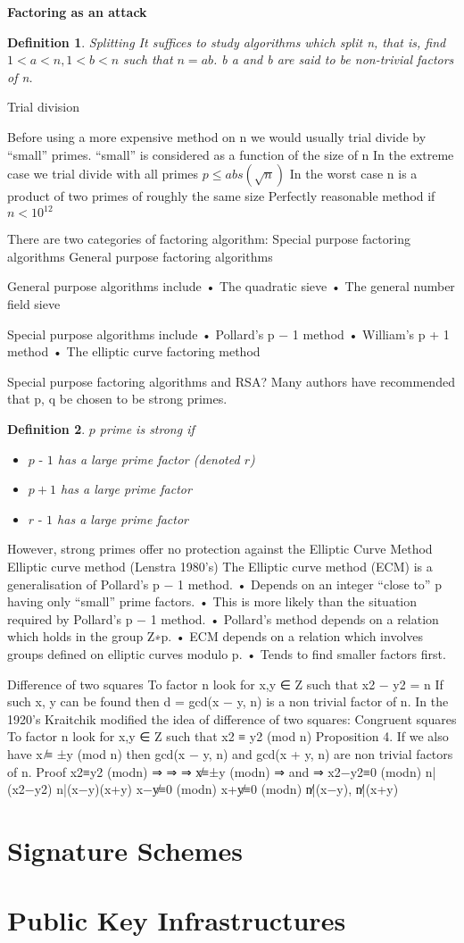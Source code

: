 \documentclass{article}
\theoremstyle{quest}
\newtheorem*{definition}{Definition}
\newcommand{\mns}{\textrm{ -  }}
\begin{document}
\textbf{Factoring as an attack}
\begin{definition}
    \textit{Splitting}
It suffices to study algorithms which split n, that is, 
    find $1 < a < n, 1 < b < n$ such that $n = ab$.
    b a and b are said to be non-trivial factors of n.
\end{definition}

Trial division

Before using a more expensive method on n we would usually trial divide by “small” primes.
 “small” is considered as a function of the size of n
In the extreme case we trial divide with all primes $p \leq abs(\sqrt{n})$
In the worst case n is a product of two primes of roughly the same size
Perfectly reasonable method if $n < 10^{12}$

There are two categories of factoring algorithm:
Special purpose factoring algorithms
General purpose factoring algorithms

General purpose algorithms include
• The quadratic sieve
• The general number field sieve

Special purpose algorithms include
• Pollard’s p − 1 method
• William’s p + 1 method
• The elliptic curve factoring method

Special purpose factoring algorithms and RSA?
Many authors have recommended that p, q be chosen to be strong primes.

\begin{definition}
    $p$ prime is strong if
    \begin{itemize}
        \item $p \mns 1$ has a large prime factor (denoted $r$)
        \item $p + 1$ has a large prime factor
        \item $r \mns 1$ has a large prime factor
    \end{itemize}
\end{definition}

However, strong primes offer no protection against the Elliptic Curve Method
Elliptic curve method (Lenstra 1980’s)
The Elliptic curve method (ECM) is a generalisation of Pollard’s p − 1 method.
• Depends on an integer “close to” p having only “small” prime factors.
• This is more likely than the situation required by Pollard’s p − 1 method.
• Pollard’s method depends on a relation which holds in the group Z∗p.
• ECM depends on a relation which involves groups defined on elliptic curves modulo p.
• Tends to find smaller factors first.

Difference of two squares
To factor n look for x,y ∈ Z such that
x2 − y2 = n
If such x, y can be found then d = gcd(x − y, n) is a non trivial factor of n.
In the 1920’s Kraitchik modified the idea of difference of two squares:
Congruent squares
To factor n look for x,y ∈ Z such that
x2 ≡ y2 (mod n)
Proposition 4.
If we also have x ̸≡ ±y (mod n) then gcd(x − y, n) and gcd(x + y, n) are non trivial factors of n.
Proof
x2≡y2 (modn) ⇒ ⇒ ⇒
x̸≡±y (modn) ⇒ and
⇒
x2−y2≡0 (modn) n|(x2−y2) n|(x−y)(x+y)
x−y̸≡0 (modn) x+y̸≡0 (modn) n̸|(x−y), n̸|(x+y)






\section{Signature Schemes}
\section{Public Key Infrastructures}
\end{document}
